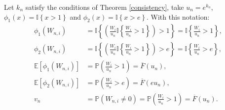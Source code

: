 \documentclass[sn-mathphys-ay]{sn-jnl}%
\renewcommand{\P}{\mathbb{P}}
\newcommand{\E}{\mathbb{E}}
\begin{document}
\begin{appendices}
Let \(k_n\) satisfy the conditions of Theorem \ref{consistency}, take
\(u_n=e^{k_n}\), \({\phi _1}\left( x \right) = \mathbb{I}\left\{ {x > 1} \right\}\)
and \({\phi _2}\left( x \right) = \mathbb{I}\left\{ {x > e} \right\}\). With this
notation:
\begin{align*}
    {\phi _1}\left( {{W_{n,i}}} \right)                & = \mathbb{I}\left\{ {\left( {\frac{{{W_i}}}{{{u_n}}}\mathbb{I}\left\{ {\frac{{{W_i}}}{{{u_n}}} > 1} \right\}} \right) > 1} \right\} = \mathbb{I}\left\{ {\frac{{{W_i}}}{{{u_n}}} > 1} \right\}, \\
    {\phi _2}\left( {{W_{n,i}}} \right)                & = \mathbb{I}\left\{ {\left( {\frac{{{W_i}}}{{{u_n}}}\mathbb{I}\left\{ {\frac{{{W_i}}}{{{u_n}}} > 1} \right\}} \right) > e} \right\} = \mathbb{I}\left\{ {\frac{{{W_i}}}{{{u_n}}} > e} \right\}, \\
    \E\left[{\phi _1}\left( {{W_{n,i}}} \right)\right] & = \P\left( {\frac{{{W_i}}}{{{u_n}}} > 1} \right) = \overline F \left( {{u_n}} \right),                                                                                                          \\
    \E\left[{\phi _2}\left( {{W_{n,i}}} \right)\right] & = \P\left( {\frac{{{W_i}}}{{{u_n}}} > e} \right) = \overline F \left( {e{u_n}} \right),                                                                                                         \\
    {v_n}                                              & = \P\left( {{W_{n,i}} \ne 0} \right) = \P\left( {\frac{{{W_i}}}{{{u_n}}} > 1} \right) = \overline F \left( {{u_n}} \right).
\end{align*}


\end{appendices}
\end{document}
